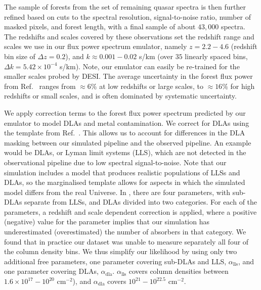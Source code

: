The sample of \lya forests from the set of remaining quasar spectra is then further refined based on cuts to the spectral resolution, signal-to-noise ratio, number of masked pixels, and forest length, with a final sample of about $43,000$ spectra.
The redshifts and scales covered by these observations set the redshift range and scales we use in our flux power spectrum emulator, namely $z=2.2-4.6$ (redshift bin size of $\Delta z = 0.2$), and $k\approx0.001-0.02$ s/km (over $35$ linearly spaced bins, $\Delta k = 5.42\times10^{-4}$ s/km).
Note, our emulator can easily be re-trained for the smaller scales probed by DESI.
The average uncertainty in the \lya forest flux power from Ref.~\cite{2019JCAP...07..017C} ranges from $\approx6\%$ at low redshifts or large scales, to $\approx16\%$ for high redshifts or small scales, and is often dominated by systematic uncertainty.

We apply correction terms to the \lya forest flux power spectrum predicted by our emulator to model DLAs and metal contamination.
We correct for DLAs using the template from Ref.~\cite{2018MNRAS.474.3032R}.
This allows us to account for differences in the DLA masking between our simulated pipeline and the observed pipeline.
An example would be DLAs, or Lyman limit systems (LLS), which are not detected in the observational pipeline due to low spectral signal-to-noise.
Note that our simulation includes a model that produces realistic populations of LLSs and DLAs, so the marginalised template allows for aspects in which the simulated model differs from the real Universe.
In \cite{2018MNRAS.474.3032R}, there are four parameters, with sub-DLAs separate from LLSs, and DLAs divided into two categories.
For each of the parameters, a redshift and scale dependent correction is applied, where a positive (negative) value for the parameter implies that our simulation has underestimated (overestimated) the number of absorbers in that category. 
We found that in practice our dataset was unable to measure separately all four of the column density bins.
We thus simplify our likelihood by using only two additional free parameters, one parameter covering sub-DLAs and LLS, $\alpha_{\mathrm{lls}}$, and one parameter covering DLAs, $\alpha_{\mathrm{dla}}$.
$\alpha_{\mathrm{lls}}$ covers column densities between $1.6\times10^{17} - 10^{20}$ cm$^{-2}$), and $\alpha_{\mathrm{dla}}$ covers $10^{21}-10^{22.5}$  cm$^{-2}$. 

